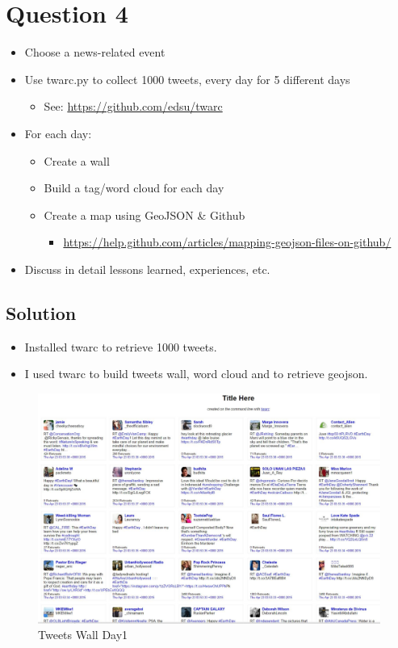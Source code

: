


\section{Question 4}
\label{part1}

\begin{itemize}
\item Choose a news-related event
\item Use twarc.py to collect 1000 tweets, every day for 5 different days
\begin{itemize}
\item See: \url {https://github.com/edsu/twarc}
\end{itemize}
\item For each day:
\begin{itemize}
\item Create a wall
\item Build a tag/word cloud for each day
\item Create a map using GeoJSON \& Github
\begin{itemize}
\item \url {https://help.github.com/articles/mapping-geojson-files-on-github/} 
\end{itemize}
\end{itemize}
\item Discuss in detail lessons learned, experiences, etc.
\end{itemize}
\subsection{Solution}

\begin{itemize}
	\item Installed twarc\cite{jusText} to retrieve 1000 tweets.
	\item I used twarc to build tweets wall, word cloud and to retrieve geojson.
\end{itemize}


\begin{figure}[ht]
	\begin{center}
		 \includegraphics[scale=0.40]{Day1Wall}
		  \caption{Tweets Wall Day1}
	 \end{center}
\end{figure}

